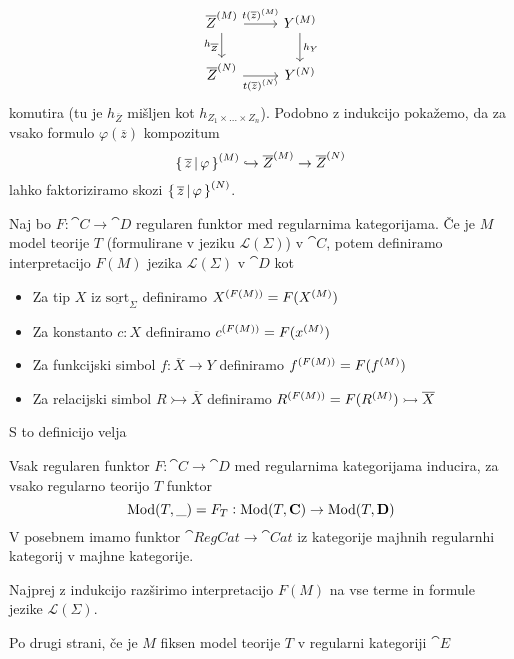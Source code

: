 \documentclass[../kategoricna_logika.tex]{subfiles}
\begin{document}
\begin{equation*}
  \begin{tikzcd}
    \interp{\overline{Z}} \ar[d, "h_{\overline{Z}}"'] \ar[r, "{t(\overline{z})^{(M)}}"] & \interp{Y} \ar[d, "h_Y"] \\
    \interp[N]{\overline{Z}} \ar[r, "{\interp[N]{t(\overline{z})}}"'] & \interp[N]{Y}
  \end{tikzcd}
\end{equation*}
komutira (tu je $h_{\overline{Z}}$ mišljen kot $h_{Z_1 \times \ldots \times Z_n}$).
Podobno z indukcijo pokažemo, da za vsako formulo $\varphi(\overline{z})$ kompozitum
$$\interp{\set{\overline{z} \,\middle|\, \varphi}} \hookrightarrow \interp{\overline{Z}} \to \interp[N]{\overline{Z}}$$
lahko faktoriziramo skozi $\interp[N]{\set{\overline{z} \,\middle|\, \varphi}}$.
\begin{definicija}
  Naj bo $F : \cat{C} \to \cat{D}$ regularen funktor med regularnima kategorijama.
  Če je $M$ model teorije $T$ (formulirane v jeziku $\mathcal{L}(\Sigma)$) v $\cat{C}$,
  potem definiramo interpretacijo $F(M)$ jezika $\mathcal{L}(\Sigma)$ v $\cat{D}$ kot
  \begin{itemize}
    \item Za tip $X$ iz $\underline{\mathrm{sort}}_\Sigma$ definiramo $\interp[F(M)]{X} = F(\interp{X})$
    \item Za konstanto $c:X$ definiramo $\interp[F(M)]{c} = F(\interp{x})$
    \item Za funkcijski simbol $f : \overline{X} \to Y$ definiramo $\interp[F(M)]{f} = F(\interp{f})$
    \item Za relacijski simbol $R \rightarrowtail \overline{X}$ definiramo $\interp[F(M)]{R} = F(\interp{R}) \rightarrowtail \overline{X}$
  \end{itemize}
\end{definicija}
S to definicijo velja
\begin{lema}
  Vsak regularen funktor $F : \cat{C} \to \cat{D}$ med regularnima kategorijama inducira,
  za vsako regularno teorijo $T$ funktor
  $$\Mod(T, \_)=F_T : \Mod(T,\cat{C}) \to \Mod(T, \cat{D})$$
  V posebnem imamo funktor $\cat{RegCat} \to \cat{Cat}$ iz kategorije majhnih regularnhi kategorij v majhne kategorije.
\end{lema}
\begin{dokaz}
  Najprej z indukcijo razširimo interpretacijo $F(M)$ na vse terme in formule jezike $\mathcal{L}(\Sigma)$.
\end{dokaz}
Po drugi strani, če je $M$ fiksen model teorije $T$ v regularni kategoriji $\cat{E}$
\end{document}
